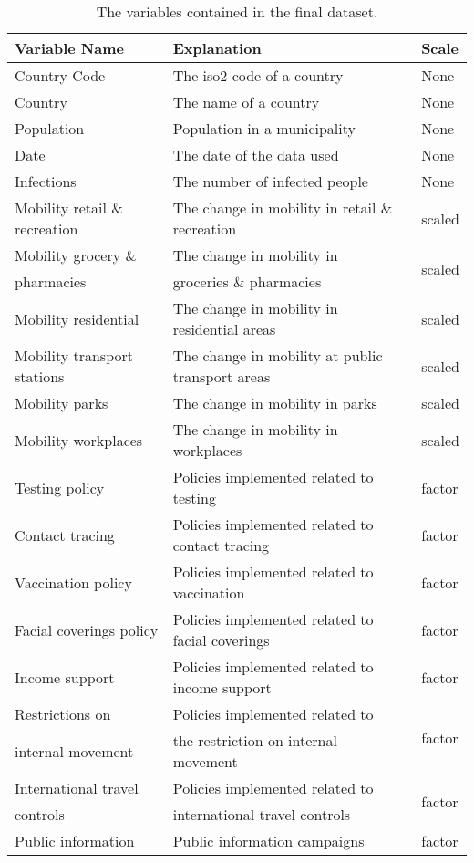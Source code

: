 \begin{table}[H] 
\caption{The variables contained in the final dataset.\label{datasetTimeseries}}
\begin{tabular}{l l l}
\toprule
\textbf{Variable Name}	& \textbf{Explanation}	& \textbf{Scale}\\
\midrule
Country Code & The iso2 code of a country & None \\
Country & The name of a country & None \\
Population & Population in a municipality & None \\
Date & The date of the data used & None \\
Infections & The number of infected people & None \\
Mobility retail \& recreation & The change in mobility in retail \& recreation & scaled \\
Mobility grocery \&& The change in mobility in & \multirow{2}{*}{scaled} \\
pharmacies & groceries \& pharmacies \\
Mobility residential & The change in mobility in residential areas & scaled \\
Mobility transport stations  & The change in mobility at public transport areas & scaled \\
Mobility parks  & The change in mobility in parks & scaled \\
Mobility workplaces  & The change in mobility in workplaces & scaled \\
Testing policy & Policies implemented related to testing & factor \\
Contact tracing & Policies implemented related to contact tracing & factor \\
Vaccination policy & Policies implemented related to vaccination & factor \\
Facial coverings policy & Policies implemented related to facial coverings & factor \\
Income support & Policies implemented related to income support & factor \\
Restrictions on  & Policies implemented related to &  \multirow{2}{*}{factor} \\
internal movement & the restriction on internal movement \\
International travel & Policies implemented related to& \multirow{2}{*}{factor} \\
controls & international travel controls \\
Public information & Public information campaigns & \multirow{2}{*}{factor} \\

\end{tabular}
\end{table}
